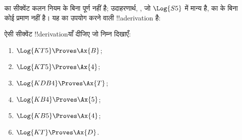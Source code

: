 \documentclass[../../../include/open-logic-section]{subfiles}
\begin{document}
\begin{ex}
 का सीक्वेंट कलन \Cut{} नियम के बिना पूर्ण नहीं है; उदाहरणार्थ,
,
जो $\Log{S5}$ में मान्य है, का \Cut{} के बिना कोई प्रमाण नहीं है। यह
\Cut{} का उपयोग करने वाली !!a{derivation} है:
\begin{prooftree}
\end{prooftree}
\end{ex}

\begin{prob}
ऐसी सीक्वेंट !!{derivation}याँ दीजिए जो निम्न दिखाएँ:
  \begin{enumerate}
  \item $\Log{KT5} \Proves \Ax{B}$;
  \item $\Log{KT5} \Proves \Ax{4}$;
  \item $\Log{KDB4} \Proves \Ax{T}$;
  \item $\Log{KB4} \Proves \Ax{5}$;
  \item $\Log{KB5} \Proves \Ax{4}$;
  \item $\Log{KT} \Proves \Ax{D}$.
  \end{enumerate}
\end{prob}
\end{document}

